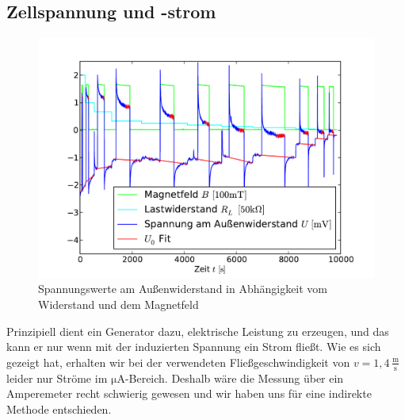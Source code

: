 \documentclass[11pt]{scrartcl}
\newcommand{\unit}[1]{\ensuremath{\,\mathrm{#1}}} %
\begin{document}
\subsection{Zellspannung und -strom}		%
\begin{figure}[ht]
\begin{center}
\includegraphics[width=1.0\textwidth]{images/rohdaten_strom.pdf}
\end{center}
\vspace{-1.5\baselineskip}
\caption{Spannungswerte am Außenwiderstand in Abhängigkeit vom Widerstand und dem Magnetfeld}
\label{rohdatenstrom}
\end{figure}
Prinzipiell dient ein Generator dazu, elektrische Leistung zu erzeugen, und das kann er nur wenn mit der induzierten Spannung ein Strom fließt.
Wie es sich gezeigt hat, erhalten wir bei der verwendeten Fließgeschwindigkeit von $v=1,4\unit{\frac{m}{s}}$ leider nur Ströme im $\mathrm{\mu A}$-Bereich.
Deshalb wäre die Messung über ein Amperemeter recht schwierig gewesen und wir haben uns für eine indirekte Methode entschieden.
\end{document}
